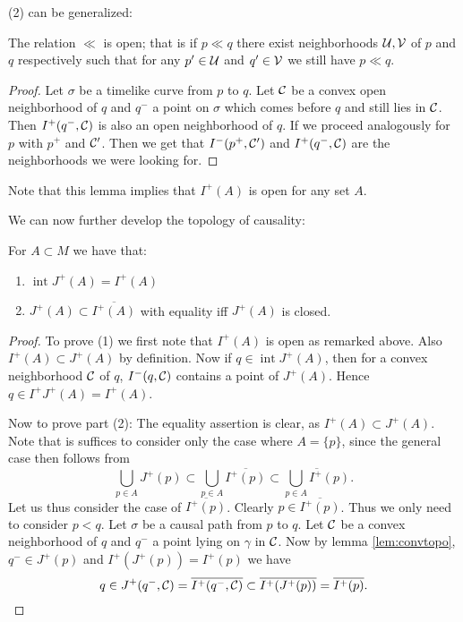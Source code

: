 (2) can be generalized:

\begin{lemma}
The relation $\ll$ is open; that is if $p\ll q$ there exist neighborhoods $\mathcal{U},\mathcal{V}$ of $p$ and $q$ respectively such that for any $p'\in \mathcal{U}$ and $q'\in \mathcal{V}$ we still have $p\ll q$.
\end{lemma}
\begin{proof}
Let $\sigma$ be a timelike curve from $p$ to $q$. Let $\mathcal{C}$ be a convex open neighborhood of $q$ and $q^-$ a point on $\sigma$ which comes before $q$ and still lies in $\mathcal{C}$. Then $I^+(q^-,\mathcal{C})$ is also an open neighborhood of $q$. If we proceed analogously for $p$ with $p^+$ and $\mathcal{C}'$. Then we get that $I^-(p^+,\mathcal{C}')$ and $I^+(q^-,\mathcal{C})$ are the neighborhoods we were looking for.
\end{proof}

Note that this lemma implies that $I^+(A)$ is open for any set $A$.

We can now further develop the topology of causality:
\begin{lemma}
For $A \subset M$ we have that:
\begin{enumerate}[label={\textnormal{(\arabic*)}}]
    \item $\operatorname{int} J^+(A)=I^+(A)$
    \item $J^+(A)\subset\overline{I^+(A)}$ with equality iff $J^+(A)$ is closed.
\end{enumerate}
\end{lemma}
\begin{proof}
To prove (1) we first note that $I^+(A)$ is open as remarked above. Also $I^+(A)\subset J^+(A)$ by definition. Now if $q\in \operatorname{int}J^+(A)$, then for a convex neighborhood $\mathcal{C}$ of $q$, $I^-(q,\mathcal{C})$ contains a point of $J^+(A)$. Hence $q\in I^+J^+(A) = I^+(A)$.

Now to prove part (2): The equality assertion is clear, as $I^+(A)\subset J^+(A)$. Note that is suffices to consider only the case where $A=\{p\}$, since the general case then follows from
\[
\bigcup_{p\in A}J^+(p) \subset \bigcup_{p\in A}\overline{I^+(p)} \subset \overline{\bigcup_{p\in A}I^+(p)}.
\]
Let us thus consider the case of $\overline{I^+(p)}$. Clearly $p\in \overline{I^+(p)}$. Thus we only need to consider $p<q$. Let $\sigma$ be a causal path from $p$ to $q$. Let $\mathcal{C}$ be a convex neighborhood of $q$ and $q^-$ a point lying on $\gamma$ in $\mathcal{C}$. Now by lemma \ref{lem:convtopo}, $q^-\in J^+(p)$ and $I^+(J^+(p))=I^+(p)$ we have 
\[
q\in J^+(q^-,\mathcal{C}) = \overline{I^+(q^-,\mathcal{C})} \subset \overline{I^+(J^+(p))} = \overline{I^+(p)}.
\]
\end{proof}

